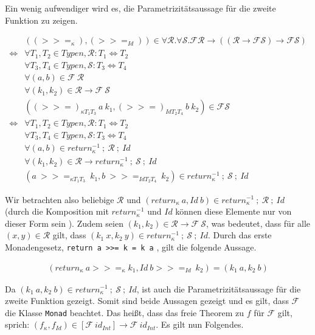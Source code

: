 Ein wenig aufwendiger wird es, die Parametrizitätsaussage für die zweite Funktion zu zeigen.

\begin{align*}
& ((>>=_{\kappa}), (>>=_{Id})) \in \forall \mathcal{R}. \forall \mathcal{S}. \mathcal{F} \mathcal{R} \rightarrow
((\mathcal{R} \rightarrow \mathcal{F} \mathcal{S}) \rightarrow \mathcal{F} \mathcal{S}) \\
\Leftrightarrow & \forall T_1, T_2 \in Typen, \mathcal{R} : T_1 \Leftrightarrow T_2 \\
& \forall T_3, T_4 \in Typen, \mathcal{S} : T_3 \Leftrightarrow T_4 \\
& \forall (a, b) \in \mathcal{F}\ \mathcal{R} \\
& \forall (k_1, k_2) \in \mathcal{R} \rightarrow \mathcal{F}\ \mathcal{S}\\
& ((>>=)_{\kappa T_1 T_3}\ a\ k_1, (>>=)_{Id T_2 T_4}\ b\ k_2) \in \mathcal{F} \mathcal{S}\\
\Leftrightarrow & \forall T_1, T_2 \in Typen, \mathcal{R} : T_1 \Leftrightarrow T_2 \\
& \forall T_3, T_4 \in Typen, \mathcal{S} : T_3 \Leftrightarrow T_4 \\
& \forall (a, b) \in return_{\kappa}^{-1}~;~\mathcal{R}~;~Id \\
& \forall (k_1, k_2) \in \mathcal{R} \rightarrow return_{\kappa}^{-1}~;~\mathcal{S}~;~Id\\
& (a\ >>=_{\kappa T_1 T_3}\ k_1, b\ >>=_{Id T_2 T_4}\ k_2) \in return_{\kappa}^{-1}~;~\mathcal{S}~;~Id
\end{align*}

Wir betrachten also beliebige $\mathcal{R}$ und $(return_{\kappa}\ a, Id\ b) \in return_{\kappa}^{-1}~;~\mathcal{R}~;~Id$
(durch die Komposition mit $return_{\kappa}^{-1}$ und $Id$ können diese Elemente nur von dieser Form sein ).
Zudem seien $(k_1, k_2) \in \mathcal{R} \rightarrow \mathcal{F}\ \mathcal{S}$, was bedeutet, dass für alle $(x, y) \in \mathcal{R}$
gilt, dass $(k_1\ x, k_2\ y) \in return_{\kappa}^{-1}~;~\mathcal{S}~;~Id$.
Durch das erste Monadengesetz, \texttt{return a >>= k = k a} , gilt die folgende Aussage.

\begin{align*}
(return_{\kappa}\ a >>=_{\kappa} k_1, Id\ b >>=_{Id}\ k_2) = (k_1\ a, k_2\ b)
\end{align*}

Da $(k_1\ a, k_2\ b) \in return_{\kappa}^{-1}~;~\mathcal{S}~;~Id$, ist auch die Parametrizitätsaussage für die zweite Funktion
gezeigt. Somit sind beide Aussagen gezeigt und es gilt, dass $\mathcal{F}$ die Klasse \texttt{Monad} beachtet. Das heißt, dass
das freie Theorem zu $f$ für $\mathcal{F}$ gilt, sprich: $(f_{\kappa}, f_{Id}) \in [\mathcal{F}\ id_{Int}] \rightarrow \mathcal{F}\ 
id_{Int}$. Es gilt nun Folgendes.


